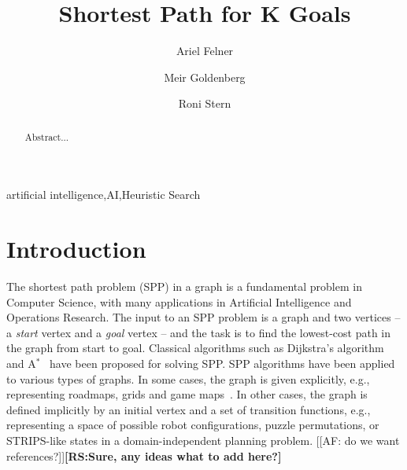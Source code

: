 \documentclass{aicom2e}
\newcommand{\astar}{A$^*$}
\newcommand{\roni}[1]{\textbf{[RS:#1]}}
\begin{document}
\begin{frontmatter}                           %
%
\title{Shortest Path for K Goals}
\maketitle
%
\author[]{Ariel Felner}
\address{Ben Gurion University of the Negev\\ Be'er Sheva, Israel\\
    E-mail: felner@bgu.ac.il}

\author[]{Meir Goldenberg}
\address{The Jerusalem College of Technology\\ Jerusalem, Israel\\
    E-mail: mgoldenbe@gmail.com}
\author[]{Roni Stern}
\address{Ben Gurion University of the Negev\\ Be'er Sheva, Israel\\
    E-mail: roni.stern@gmail.com}

\begin{abstract}
Abstract...

\end{abstract}

\begin{keyword}
artificial intelligence\sep AI\sep Heuristic Search
\end{keyword}
%
\end{frontmatter}

\section{Introduction}


The shortest path problem (SPP) in a graph is a fundamental problem in Computer
Science, with many applications in Artificial Intelligence and Operations
Research. The input to an SPP problem is a graph and two vertices -- a {\em
start} vertex and a {\em goal} vertex -- and the task is to find the
lowest-cost path in the graph from start to goal. Classical algorithms such as
Dijkstra's algorithm~\cite{DIJ59} and \astar{}~\cite{hartNR68Astar} have been
proposed for solving SPP. SPP algorithms have been applied to various types of
graphs. In some cases, the graph is given explicitly, e.g., representing
roadmaps, grids and game maps~\cite{sturtevant2012benchmarks}. In other cases,
the graph is defined implicitly by an initial vertex and a set of transition
functions, e.g., representing a space of possible robot configurations, puzzle
permutations, or STRIPS-like states in a domain-independent planning problem. 
[[AF: do we want references?]]\roni{Sure, any ideas what to add here?}
\end{document}
